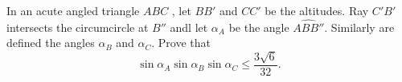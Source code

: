 In an acute angled triangle $ABC$ , let $BB' $ and  $CC'$ be the altitudes. Ray $C'B'$ intersects the circumcircle at $B''$ andl let $\alpha_A$ be the angle  $\widehat{ABB''}$. Similarly are defined the angles $\alpha_B$ and $\alpha_C$. Prove that $$\displaystyle\sin \alpha _A \sin \alpha _B \sin \alpha _C\leq \frac{3\sqrt{6}}{32}.$$
